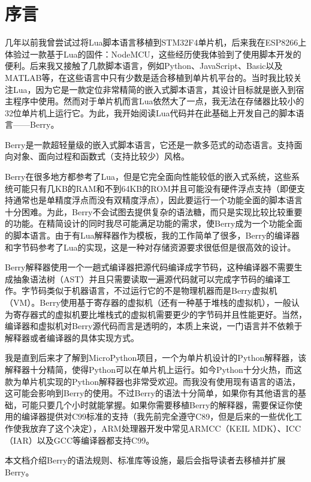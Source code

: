 \chapter*{序\quad 言}

\pagestyle{empty}
\thispagestyle{empty}

几年以前我曾尝试过将Lua脚本语言移植到STM32F4单片机，后来我在ESP8266上体验过一款基于Lua的固件：NodeMCU，这些经历使我体验到了使用脚本开发的便利。后来我又接触了几款脚本语言，例如Python、JavaScript、Basic以及MATLAB等，在这些语言中只有少数是适合移植到单片机平台的。当时我比较关注Lua，因为它是一款定位非常精简的嵌入式脚本语言，其设计目标就是嵌入到宿主程序中使用。然而对于单片机而言Lua依然大了一点，我无法在存储器比较小的32位单片机上运行它。为此，我开始阅读Lua代码并在此基础上开发自己的脚本语言------Berry。

Berry是一款超轻量级的嵌入式脚本语言，它还是一款多范式的动态语言。支持面向对象、面向过程和函数式（支持比较少）风格。

Berry在很多地方都参考了Lua，但是它完全面向性能较低的嵌入式系统，这些系统可能只有几KB的RAM和不到64KB的ROM并且可能没有硬件浮点支持（即便支持通常也是单精度浮点而没有双精度浮点），因此要运行一个功能全面的脚本语言十分困难。为此，Berry不会试图去提供复杂的语法糖，而只是实现比较比较重要的功能。在精简设计的同时我尽可能满足功能的需求，使Berry成为一个功能全面的脚本语言。由于有Lua解释器作为模板，我的工作简单了很多，Berry的编译器和字节码参考了Lua的实现，这是一种对存储资源要求很低但是很高效的设计。

Berry解释器使用一个一趟式编译器把源代码编译成字节码，这种编译器不需要生成抽象语法树（AST）并且只需要读取一遍源代码就可以完成字节码的编译工作。字节码类似于机器语言，不过运行它的不是物理机器而是Berry虚拟机（VM）。Berry使用基于寄存器的虚拟机（还有一种基于堆栈的虚拟机），一般认为寄存器式的虚拟机要比堆栈式的虚拟机需要更少的字节码并且性能更好。当然，编译器和虚拟机对Berry源代码而言是透明的，本质上来说，一门语言并不依赖于解释器或者编译器的具体实现方式。

我是直到后来才了解到MicroPython项目，一个为单片机设计的Python解释器，该解释器十分精简，使得Python可以在单片机上运行。如今Python十分火热，而这款为单片机实现的Python解释器也非常受欢迎。而我没有使用现有语言的语法，这可能会影响到Berry的使用。不过Berry的语法十分简单，如果你有其他语言的基础，可能只要几个小时就能掌握。如果你需要移植Berry的解释器，需要保证你使用的编译器提供对C99标准的支持（我先前完全遵守C89，但是后来的一些优化工作使我放弃了这个决定），ARM处理器开发中常见ARMCC（KEIL MDK）、ICC（IAR）以及GCC等编译器都支持C99。

本文档介绍Berry的语法规则、标准库等设施，最后会指导读者去移植并扩展Berry。
